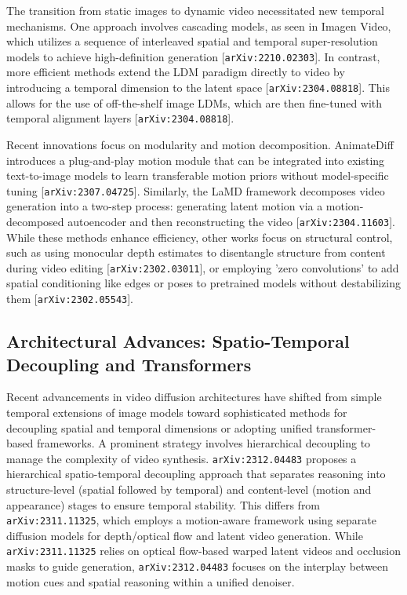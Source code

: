\documentclass[11pt]{article}
\begin{document}
The transition from static images to dynamic video necessitated new temporal mechanisms. One approach involves cascading models, as seen in Imagen Video, which utilizes a sequence of interleaved spatial and temporal super-resolution models to achieve high-definition generation [\texttt{arXiv:2210.02303}]. In contrast, more efficient methods extend the LDM paradigm directly to video by introducing a temporal dimension to the latent space [\texttt{arXiv:2304.08818}]. This allows for the use of off-the-shelf image LDMs, which are then fine-tuned with temporal alignment layers [\texttt{arXiv:2304.08818}].

Recent innovations focus on modularity and motion decomposition. AnimateDiff introduces a plug-and-play motion module that can be integrated into existing text-to-image models to learn transferable motion priors without model-specific tuning [\texttt{arXiv:2307.04725}]. Similarly, the LaMD framework decomposes video generation into a two-step process: generating latent motion via a motion-decomposed autoencoder and then reconstructing the video [\texttt{arXiv:2304.11603}]. While these methods enhance efficiency, other works focus on structural control, such as using monocular depth estimates to disentangle structure from content during video editing [\texttt{arXiv:2302.03011}], or employing 'zero convolutions' to add spatial conditioning like edges or poses to pretrained models without destabilizing them [\texttt{arXiv:2302.05543}].

\subsection{Architectural Advances: Spatio-Temporal Decoupling and Transformers}

Recent advancements in video diffusion architectures have shifted from simple temporal extensions of image models toward sophisticated methods for decoupling spatial and temporal dimensions or adopting unified transformer-based frameworks. A prominent strategy involves hierarchical decoupling to manage the complexity of video synthesis. \texttt{arXiv:2312.04483} proposes a hierarchical spatio-temporal decoupling approach that separates reasoning into structure-level (spatial followed by temporal) and content-level (motion and appearance) stages to ensure temporal stability. This differs from \texttt{arXiv:2311.11325}, which employs a motion-aware framework using separate diffusion models for depth/optical flow and latent video generation. While \texttt{arXiv:2311.11325} relies on optical flow-based warped latent videos and occlusion masks to guide generation, \texttt{arXiv:2312.04483} focuses on the interplay between motion cues and spatial reasoning within a unified denoiser.
\end{document}
